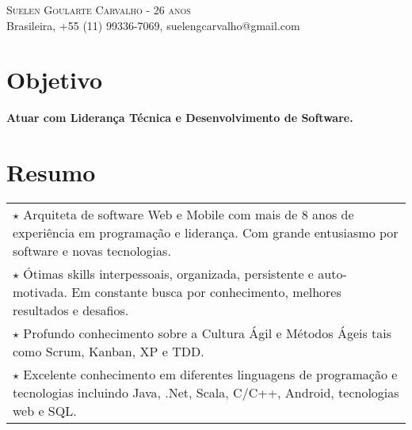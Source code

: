 \documentclass[a4paper, oneside, final]{scrartcl}
\newcommand{\vspc}{\vspace{0.15cm}} %
\begin{document}
\begin{center}
\textsc{\Huge{Suelen Goularte Carvalho - 26 anos}} \vspc\\
{\small Brasileira, +55 (11) 99336-7069, suelengcarvalho@gmail.com} 


\section{Objetivo}
	{\bf Atuar com Liderança Técnica e Desenvolvimento de Software. }



\section{Resumo}
\begin{tabularx}{1\linewidth}{X}
	$\star$ Arquiteta de software Web e Mobile com mais de 8 anos de experiência em programação e liderança. Com grande entusiasmo por software e novas tecnologias. \vspc\\
	
	$\star$ Ótimas skills interpessoais, organizada, persistente e auto-motivada. Em constante busca por conhecimento, melhores resultados e desafios. \vspc\\
	
	$\star$ Profundo conhecimento sobre a Cultura Ágil e Métodos Ágeis tais como Scrum, Kanban, XP e TDD. \vspc\\
	
	$\star$ Excelente conhecimento em diferentes linguagens de programação e tecnologias incluindo Java, .Net, Scala, C/C++, Android, tecnologias web e SQL. \vspc\\
	

\end{tabularx}
\end{center}
\end{document}
